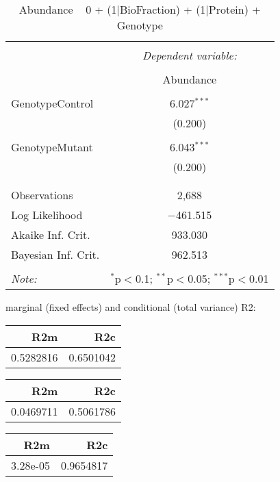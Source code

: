 \documentclass[11pt]{report}
\begin{document}
\begin{table}[!htbp] \centering 
  \caption{Abundance ~ 0 + (1|BioFraction) + (1|Protein) + Genotype} 
  \label{} 
\begin{tabular}{@{\extracolsep{5pt}}lc} 
\\[-1.8ex]\hline 
\hline \\[-1.8ex] 
 & \multicolumn{1}{c}{\textit{Dependent variable:}} \\ 
\cline{2-2} 
\\[-1.8ex] & Abundance \\ 
\hline \\[-1.8ex] 
 GenotypeControl & 6.027$^{***}$ \\ 
  & (0.200) \\ 
  & \\ 
 GenotypeMutant & 6.043$^{***}$ \\ 
  & (0.200) \\ 
  & \\ 
\hline \\[-1.8ex] 
Observations & 2,688 \\ 
Log Likelihood & $-$461.515 \\ 
Akaike Inf. Crit. & 933.030 \\ 
Bayesian Inf. Crit. & 962.513 \\ 
\hline 
\hline \\[-1.8ex] 
\textit{Note:}  & \multicolumn{1}{r}{$^{*}$p$<$0.1; $^{**}$p$<$0.05; $^{***}$p$<$0.01} \\ 
\end{tabular} 
\end{table} 
marginal (fixed effects) and conditional (total variance) R2:

\begin{tabular}{r|r}
\hline
R2m & R2c\\
\hline
0.5282816 & 0.6501042\\
\hline
\end{tabular}

\begin{tabular}{r|r}
\hline
R2m & R2c\\
\hline
0.0469711 & 0.5061786\\
\hline
\end{tabular}

\begin{tabular}{r|r}
\hline
R2m & R2c\\
\hline
3.28e-05 & 0.9654817\\
\hline
\end{tabular}
\end{document}
